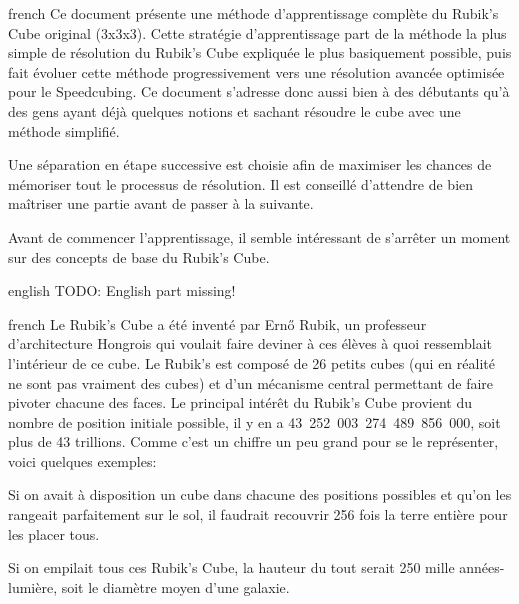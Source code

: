 \documentclass[0_Main.tex]{subfiles}
\begin{document}
\begin{shownto}{french}
Ce document présente une méthode d'apprentissage complète du Rubik's Cube original (3x3x3). Cette stratégie d'apprentissage part de la méthode la plus simple de résolution du Rubik's Cube expliquée le plus basiquement possible, puis fait évoluer cette méthode progressivement vers une résolution avancée optimisée pour le Speedcubing. Ce document s'adresse donc aussi bien à des débutants qu'à des gens ayant déjà quelques notions et sachant résoudre le cube avec une méthode simplifié.

Une séparation en étape successive est choisie afin de maximiser les chances de mémoriser tout le processus de résolution. Il est conseillé d’attendre de bien maîtriser une partie avant de passer à la suivante.

Avant de commencer l’apprentissage, il semble intéressant de s’arrêter un moment sur des concepts de base du Rubik’s Cube.
\end{shownto}

\begin{shownto}{english}
TODO: English part missing! 
\end{shownto}

\begin{shownto}{french}
Le Rubik’s Cube a été inventé par Ernő Rubik, un professeur d’architecture Hongrois qui voulait faire deviner à ces élèves à quoi ressemblait l’intérieur de ce cube.
Le Rubik’s est composé de 26 petits cubes (qui en réalité ne sont pas vraiment des cubes) et d’un mécanisme central permettant de faire pivoter chacune des faces. Le principal intérêt du Rubik’s Cube provient du nombre de position initiale possible, il y en a 43~252~003~274~489~856~000, soit plus de 43 trillions. Comme c’est un chiffre un peu grand pour se le représenter, voici quelques exemples:

Si on avait à disposition un cube dans chacune des positions possibles et qu’on les rangeait parfaitement sur le sol, il faudrait recouvrir 256 fois la terre entière pour les placer tous.

Si on empilait tous ces Rubik’s Cube, la hauteur du tout serait 250 mille années-lumière, soit le diamètre moyen d’une galaxie.
\end{shownto}
\end{document}
